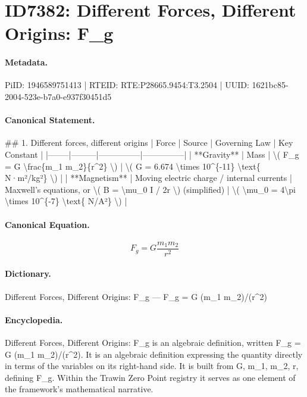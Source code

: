 \section*{ID7382: Different Forces, Different Origins: F\_g}
\paragraph{Metadata.}
PiID: 1946589751413 | RTEID: RTE:P28665.9454:T3.2504 | UUID: 1621bc85-2004-523e-b7a0-e937f30451d5

\paragraph{Canonical Statement.}
\#\# 1. Different forces, different origins | Force | Source | Governing Law | Key Constant | |--------|---------|---------------|---------------| | **Gravity** | Mass | \textbackslash{}( F\_g = G \textbackslash{}frac\{m\_1 m\_2\}\{r\textasciicircum{}2\} \textbackslash{}) | \textbackslash{}( G = 6.674 \textbackslash{}times 10\textasciicircum{}\{-11\} \textbackslash{}text\{ N·m²/kg²\} \textbackslash{}) | | **Magnetism** | Moving electric charge / internal currents | Maxwell’s equations, or \textbackslash{}( B = \textbackslash{}mu\_0 I / 2r \textbackslash{}) (simplified) | \textbackslash{}( \textbackslash{}mu\_0 = 4\textbackslash{}pi \textbackslash{}times 10\textasciicircum{}\{-7\} \textbackslash{}text\{ N/A²\} \textbackslash{}) |

\paragraph{Canonical Equation.}
\[
F_g = G \frac{m_1 m_2}{r^2}
\]

\paragraph{Dictionary.}
Different Forces, Different Origins: F\_g — F\_g = G (m\_1 m\_2)/(r\textasciicircum{}2)

\paragraph{Encyclopedia.}
Different Forces, Different Origins: F\_g is an algebraic definition, written F\_g = G (m\_1 m\_2)/(r\textasciicircum{}2). It is an algebraic definition expressing the quantity directly in terms of the variables on its right-hand side. It is built from G, m\_1, m\_2, r, defining F\_g. Within the Trawin Zero Point registry it serves as one element of the framework's mathematical narrative.
